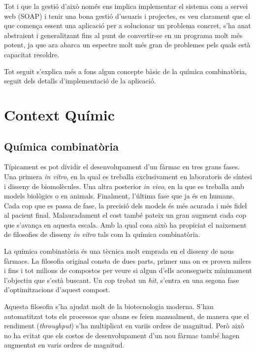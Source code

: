 	Tot i que la gestió d'això només ens implica implementar el sistema com a
	servei web (SOAP) i tenir una bona gestió d'usuaris i projectes, es veu
	clarament que el que comença essent una aplicació per a solucionar un
	problema concret, s'ha anat abstraient i generalitzant fins al punt de
	convertir-se en un programa molt més potent, ja que ara abarca un espectre
	molt més gran de problemes pels quals està capacitat resoldre.

	Tot seguit s'explica més a fons algun concepte bàsic de la química
	combinatòria, seguit dels detalls d'implementació de la aplicació.


\section{Context Químic} %
	\label{sec:Context Quimic}

	\subsection{Química combinatòria}
	Típicament es pot dividir el desenvolupament d'un fàrmac en tres grans
	fases. Una primera \emph{in vitro}, en la qual es treballa exclusivament en
	laboratoris de síntesi i disseny de biomolècules. Una altra posterior
	\emph{in vivo}, en la que es treballa amb models biològics o en animals.
	Finalment, l'última fase que ja és en humans. Cada cop que es passa de fase,
	la precisió dels models és més acurada i més fidel al pacient final.
	Malauradament el cost també pateix un gran augment cada cop que s'avança en
	aquesta escala. Amb la qual cosa això ha propiciat el naixement de
	filosofies de disseny \emph{in vitro} tals com la química combinatòria.

	La química combinatòria és una tècnica molt emprada en el disseny de nous
	fàrmacs. La filosofia original consta de dues parts, primer una on es proven
	milers i fins i tot milions de compostos per veure si algun d'ells
	aconsegueix mínimament l'objectiu que s'està buscant. Un cop trobat un
	\emph{hit}, s'entra en una segona fase d'optimitzacions d'aquest compost.

	Aquesta filosofia s'ha ajudat molt de la biotecnologia moderna. S'han
	automatitzat tots els processos que abans es feien manualment, de manera que
	el rendiment (\emph{throughput}) s'ha multiplicat en variïs ordres de
	magnitud. Però això no ha evitat que els costos de desenvolupament d'un nou
	fàrmac també hagen augmentat en varis ordres de magnitud.

